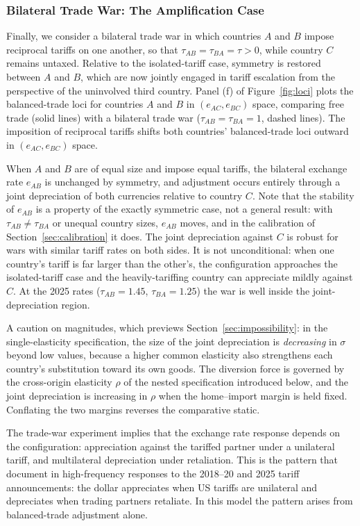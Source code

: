\documentclass[11pt]{article}
\theoremstyle{plain}
\theoremstyle{remark}
\numberwithin{lemma}{section}
\numberwithin{proposition}{section}
\numberwithin{corollary}{section}
\newcommand{\rev}[1]{{\color{RevBlue}#1}}
\begin{document}
\subsubsection{Bilateral Trade War: The Amplification Case}

Finally, we consider a bilateral trade war in which countries $A$ and $B$ impose reciprocal tariffs on one another, so that $\tau_{AB} = \tau_{BA} = \tau > 0$, while country $C$ remains untaxed. Relative to the isolated-tariff case, symmetry is restored between $A$ and $B$, which are now jointly engaged in tariff escalation from the perspective of the uninvolved third country. \rev{Panel (f) of Figure~\ref{fig:loci}} plots the balanced-trade loci for countries $A$ and $B$ in $(e_{AC}, e_{BC})$ space, comparing free trade (solid lines) with a bilateral trade war ($\tau_{AB} = \tau_{BA} = 1$, dashed lines).
The imposition of reciprocal tariffs shifts both countries' balanced-trade loci outward in $(e_{AC}, e_{BC})$ space. \rev{When $A$ and $B$ are of equal size and impose equal tariffs, the bilateral exchange rate $e_{AB}$ is unchanged by symmetry, and adjustment occurs entirely through a joint depreciation of both currencies relative to country $C$. Note that the stability of $e_{AB}$ is a property of the exactly symmetric case, not a general result: with $\tau_{AB} \neq \tau_{BA}$ or unequal country sizes, $e_{AB}$ moves, and in the calibration of Section~\ref{sec:calibration} it does. The joint depreciation against $C$ is robust for wars with similar tariff rates on both sides. It is not unconditional: when one country's tariff is far larger than the other's, the configuration approaches the isolated-tariff case and the heavily-tariffing country can appreciate mildly against $C$. At the 2025 rates ($\tau_{AB} = 1.45$, $\tau_{BA} = 1.25$) the war is well inside the joint-depreciation region.

A caution on magnitudes, which previews Section~\ref{sec:impossibility}: in the single-elasticity specification, the size of the joint depreciation is \emph{decreasing} in $\sigma$ beyond low values, because a higher common elasticity also strengthens each country's substitution toward its own goods. The diversion force is governed by the cross-origin elasticity $\rho$ of the nested specification introduced below, and the joint depreciation is increasing in $\rho$ when the home--import margin is held fixed. Conflating the two margins reverses the comparative static.

The trade-war experiment implies that the exchange rate response depends on the configuration: appreciation against the tariffed partner under a unilateral tariff, and multilateral depreciation under retaliation. This is the pattern that \cite{corsetti2025} document in high-frequency responses to the 2018--20 and 2025 tariff announcements: the dollar appreciates when US tariffs are unilateral and depreciates when trading partners retaliate. In this model the pattern arises from balanced-trade adjustment alone.}
\end{document}
